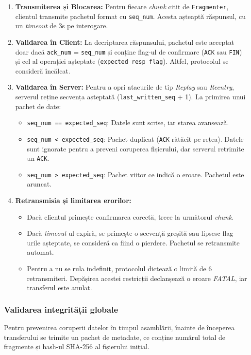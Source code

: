 \begin{enumerate}
    \item \textbf{Transmiterea și Blocarea:} Pentru fiecare \textit{chunk} citit de \texttt{Fragmenter}, clientul transmite pachetul format cu \texttt{seq\_num}. Acesta așteaptă răspunsul, cu un \textit{timeout} de 3s pe interogare.
     \item \textbf{Validarea în Client:} La decriptarea răspunsului, pachetul este acceptat doar dacă \texttt{ack\_num} = \texttt{seq\_num} și conține flag-ul de confirmare (\texttt{ACK} sau \texttt{FIN}) și cel al operației așteptate (\texttt{expected\_resp\_flag}). Altfel, protocolul se consideră încălcat.
    \item \textbf{Validarea în Server:} Pentru a opri atacurile de tip \textit{Replay} sau \textit{Reentry}, serverul reține secvența așteptată (\texttt{last\_written\_seq} + 1). La primirea unui pachet de date:
    \begin{itemize}
        \item \texttt{seq\_num == expected\_seq}: Datele sunt scrise, iar starea avansează.
        \item \texttt{seq\_num < expected\_seq}: Pachet duplicat (\texttt{ACK} rătăcit pe rețea). Datele sunt ignorate pentru a preveni coruperea fișierului, dar serverul retrimite un \texttt{ACK}.
        \item \texttt{seq\_num > expected\_seq}: Pachet viitor ce indică o eroare. Pachetul este aruncat.
    \end{itemize}
    \item \textbf{Retransmisia și limitarea erorilor:}
    \begin{itemize}
        \item Dacă clientul primește confirmarea corectă, trece la următorul \textit{chunk}.
        \item Dacă \textit{timeout}-ul expiră, se primește o secvență greșită sau lipsesc flag-urile așteptate, se consideră ca fiind o pierdere. Pachetul se retransmite automat.
        \item Pentru a nu se rula indefinit, protocolul dictează o limită de 6 retransmiteri. Depășirea acestei restricții declanșează o eroare \textit{FATAL}, iar transferul este anulat.
    \end{itemize}
\end{enumerate}

\subsubsection{Validarea integrității globale}
Pentru prevenirea coruperii datelor în timpul asamblării, înainte de începerea transferului se trimite un pachet de metadate, ce conține numărul total de fragmente și hash-ul SHA-256 al fișierului inițial.

